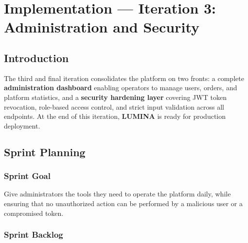 \chapter{Implementation --- Iteration 3: Administration and Security}

\section*{Introduction}
The third and final iteration consolidates the platform on two fronts:
a complete \textbf{administration dashboard} enabling operators to manage
users, orders, and platform statistics, and a \textbf{security hardening layer}
covering JWT token revocation, role-based access control, and strict input
validation across all endpoints.
At the end of this iteration, \textbf{LUMINA} is ready for production deployment.

\section{Sprint Planning}

\subsection{Sprint Goal}

\begin{tcolorbox}[colback=blue!5, colframe=blue!40, title=Sprint Goal --- Iteration 3]
Give administrators the tools they need to operate the platform daily, while
ensuring that no unauthorized action can be performed by a malicious user
or a compromised token.
\end{tcolorbox}

\subsection{Sprint Backlog}

